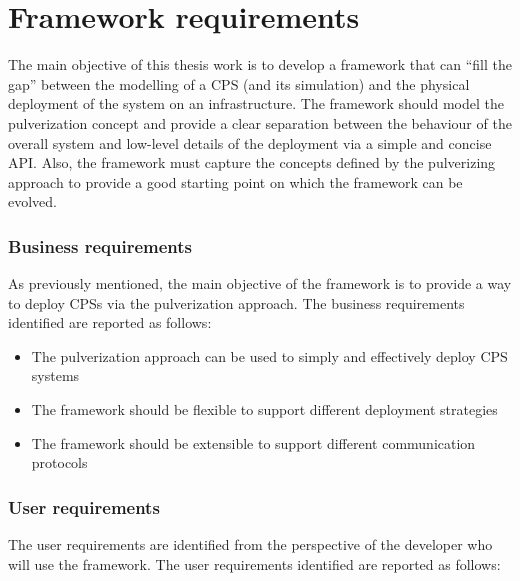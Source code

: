 
\section{Framework requirements}
\label{sec:framework-requirements}

The main objective of this thesis work is to develop a framework that can ``fill the gap'' between the modelling of a CPS (and its simulation) and
the physical deployment of the system on an infrastructure.
The framework should model the pulverization concept and provide a clear separation between the behaviour of the overall system and low-level
details of the deployment via a simple and concise API.
Also, the framework must capture the concepts defined by the pulverizing approach to provide a good starting point on which the framework can
be evolved.

\subsubsection{Business requirements}
\label{sec:business-requirements}

As previously mentioned, the main objective of the framework is to provide a way to deploy CPSs via the pulverization approach.
The business requirements identified are reported as follows:

\begin{itemize}
	\item The pulverization approach can be used to simply and effectively deploy CPS systems
	\item The framework should be flexible to support different deployment strategies
	\item The framework should be extensible to support different communication protocols
\end{itemize}

\subsubsection{User requirements}
\label{sec:user-requirements}

The user requirements are identified from the perspective of the developer who will use the framework.
The user requirements identified are reported as follows:

